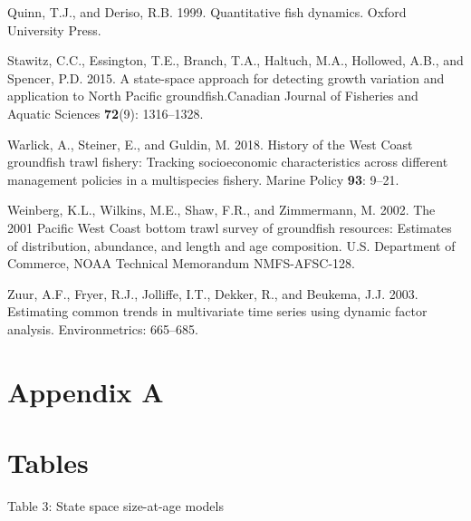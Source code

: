 \documentclass[
]{article}
\newlength{\cslhangindent}
\newlength{\cslentryspacingunit} %
\newenvironment{CSLReferences}[2] %
 {%
  \setlength{\parindent}{0pt}
  \ifodd #1
  \let\oldpar\par
  \def\par{\hangindent=\cslhangindent\oldpar}
  \fi
  \setlength{\parskip}{#2\cslentryspacingunit}
 }%
 {}
\newcommand{\cjfas}{Canadian Journal of Fisheries and Aquatic Sciences\xspace}
\begin{document}
\begin{CSLReferences}{1}{0}
\leavevmode{}%
Quinn, T.J., and Deriso, R.B. 1999. Quantitative fish dynamics. Oxford
University Press.

\leavevmode{}%
Stawitz, C.C., Essington, T.E., Branch, T.A., Haltuch, M.A., Hollowed,
A.B., and Spencer, P.D. 2015. A state-space approach for detecting
growth variation and application to {N}orth {P}acific groundfish.\cjfas
\textbf{72}(9): 1316--1328.

\leavevmode{}%
Warlick, A., Steiner, E., and Guldin, M. 2018. {History of the West
Coast groundfish trawl fishery: Tracking socioeconomic characteristics
across different management policies in a multispecies fishery}. Marine
Policy \textbf{93}: 9--21.

\leavevmode{}%
Weinberg, K.L., Wilkins, M.E., Shaw, F.R., and Zimmermann, M. 2002. The
2001 {P}acific {W}est {C}oast bottom trawl survey of groundfish
resources: Estimates of distribution, abundance, and length and age
composition. {U}.{S}. {D}epartment of {C}ommerce, {NOAA} {T}echnical
{M}emorandum {NMFS-AFSC}-128.

\leavevmode{}%
Zuur, A.F., Fryer, R.J., Jolliffe, I.T., Dekker, R., and Beukema, J.J.
2003. Estimating common trends in multivariate time series using dynamic
factor analysis. Environmetrics: 665--685.

\end{CSLReferences}

\pagebreak

\hypertarget{appendix-a}{%
\section*{Appendix A}\label{appendix-a}}

\hypertarget{tables}{%
\section{Tables}\label{tables}}

Table 3: State space size-at-age models
\end{document}
